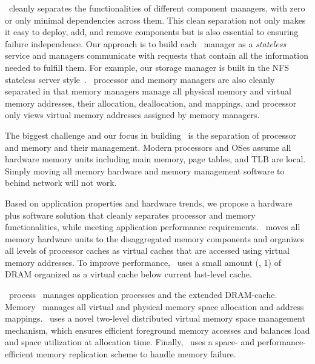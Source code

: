 \documentclass[10pt,times,twocolumn]{z2-article}
\begin{document}
\lego\ cleanly separates the functionalities of different component managers,
with zero or only minimal dependencies across them. 
This clean separation not only makes it easy to deploy, add, and remove components
but is also essential to ensuring failure independence. 
Our approach is to build each \lego\ manager as a {\em stateless}
service and managers communicate with requests that contain all the information needed to fulfill them.
For example, our storage manager is built in the NFS stateless server style~\cite{sun-nfs}.
\lego\ processor and memory managers are also cleanly separated 
in that memory managers manage all physical memory and virtual memory addresses, their allocation, deallocation, and mappings,
and processor only views virtual memory addresses assigned by memory managers. 
\fi

The biggest challenge and our focus in building \lego\ is the separation of processor and memory and their management.
Modern processors and OSes assume all hardware memory units including main memory, page tables, and TLB are local.
Simply moving all memory hardware and memory management software to behind network will not work.

Based on application properties and hardware trends, 
we propose a hardware plus software solution that cleanly separates processor and memory functionalities,
while meeting application performance requirements.
\lego\ moves all memory hardware units to the disaggregated memory components
and organizes all levels of processor caches as virtual caches that are accessed using virtual memory addresses. 
To improve performance, \lego\ uses a small amount (\eg, 1\GB) of DRAM
organized as a virtual cache below current last-level cache.

\lego\ process \microos\ manages application processes and the extended DRAM-cache.
Memory \microos\ manages all virtual and physical memory space allocation and address mappings. 
\lego\ uses a novel two-level distributed virtual memory space management mechanism,
which ensures efficient foreground memory accesses and balances load and space utilization at allocation time.
Finally, \lego\ uses a space- and performance-efficient memory replication scheme to handle memory failure.
\end{document}
